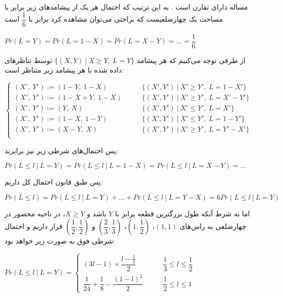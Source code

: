 \documentclass{scribe-cgenomics}
\begin{document}
\begin{حل}
مساله دارای تقارن است 
\cite{stick_countor}. 
به این ترتیب که احتمال هر یک از پیشامد‌های زیر برابر با مساحت یک چهارضلعیست که براحتی می‌توان مشاهده کرد برابر با
$\dfrac{1}{6}$
است.

\begin{center}
$
Pr(L=Y) = Pr(L=1-X) = Pr(L=X-Y) = \dots = \dfrac{1}{6}
$
\end{center}

از طرفی توجه می‌کنیم که هر پیشامد
$\{(X,Y)\ |\ X\geq Y,\ L=Y\}$
توسط تناظر‌های داده شده با هر پیشامد زیر متناظر است:

\begin{center}
$
\begin{cases}
(X',\ Y') := (1-Y,\ 1-X) & 
\qquad \{(X',Y')\ |\ X'\geq Y',\ L=1-X'\}\\
(X',\ Y') := (1-X+Y,\ 1-X) & 
\qquad \{(X',Y')\ |\ X'\geq Y',\ L=X'-Y'\}\\
(X',\ Y') := (Y,\ X) & 
\qquad \{(X',Y')\ |\ X'\leq Y',\ L=X'\}\\
(X',\ Y') := (1-X,\ 1-Y) & 
\qquad \{(X',Y')\ |\ X'\leq Y',\ L=1-Y'\}\\
(X',\ Y') := (X-Y,\ X) & 
\qquad \{(X',Y')\ |\ X'\geq Y',\ L=Y'-X'\}\\
\end{cases}
$
\end{center}

پس احتمال‌های شرطی زیر نیز برابرند:

\begin{center}
$
Pr(L\leq l\ |\ L=Y) = Pr(L\leq l\ |\ L=1-X) =Pr(L\leq l\ |\ L=X-Y) = \dots
$
\end{center}

پس طبق قانون احتمال کل داریم:

\begin{center}
$
Pr(L \leq l) = Pr(L\leq l\ |\ L=Y) + \dots + Pr(L\leq l\ |\ L=Y-X) = 6Pr(L\leq l\ |\ L=Y)
$
\end{center}

اما به شرط آنکه طول بزرگترین قطعه برابر با
$Y$
باشد و
$X\geq Y$،
در ناحیه محصور در چهارضلعی به راس‌های
$(1,1)$،
$(1,\dfrac{1}{2})$،
$(\dfrac{2}{3},\dfrac{1}{3})$
و
$(\dfrac{1}{2},\dfrac{1}{2})$
قرار داریم و احتمال شرطی فوق به صورت زیر خواهد بود:

\begin{center}
$
Pr(L\leq l\ |\ L=Y) = 
\begin{cases}
(3l-1)\times \dfrac{l-\frac{1}{3}}{2} &
\qquad \dfrac{1}{3} \leq l \leq \dfrac{1}{2}\\
\dfrac{1}{24} + \dfrac{1}{8} - \dfrac{(1-l)^2}{2} &
\qquad \dfrac{1}{2} \leq l \leq 1
\end{cases}
$
\end{center}


\end{حل}
\end{document}
